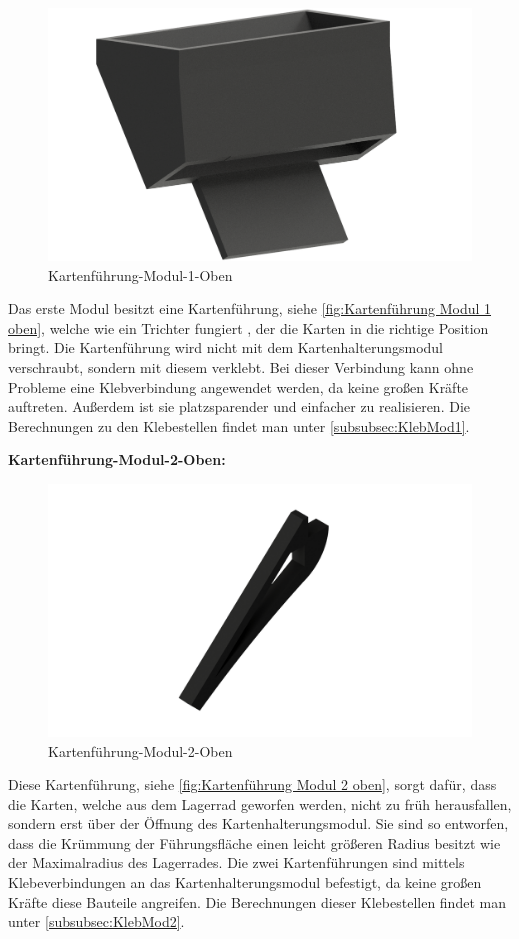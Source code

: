 \begin{figure}
    \includegraphics[width=8 cm]{fig/mech/KarteneinlaufNeu}
    \caption{Kartenführung-Modul-1-Oben}
    \label{fig:Kartenführung Modul 1 oben}
\end{figure}
Das erste Modul besitzt eine Kartenführung, siehe \autoref{fig:Kartenführung Modul 1 oben}, welche wie ein Trichter fungiert , der die Karten in die richtige Position bringt.
Die Kartenführung wird nicht mit dem Kartenhalterungsmodul verschraubt, sondern mit diesem verklebt.
Bei dieser Verbindung kann ohne Probleme eine Klebverbindung angewendet werden, da keine großen Kräfte auftreten.
Außerdem ist sie platzsparender und einfacher zu realisieren.
Die Berechnungen zu den Klebestellen findet man unter \autoref{subsubsec:KlebMod1}.

\pagebreak
\textbf{Kartenführung-Modul-2-Oben:}

\begin{figure}
    \includegraphics[width=7 cm]{fig/mech/StopperOben}
    \caption{Kartenführung-Modul-2-Oben}
    \label{fig:Kartenführung Modul 2 oben}
\end{figure}
Diese Kartenführung, siehe \autoref{fig:Kartenführung Modul 2 oben}, sorgt dafür, dass die Karten, welche aus dem Lagerrad geworfen werden, nicht zu früh herausfallen,
sondern erst über der Öffnung des Kartenhalterungsmodul.
Sie sind so entworfen, dass die Krümmung der Führungsfläche einen leicht größeren Radius besitzt wie der Maximalradius des Lagerrades.
Die zwei Kartenführungen sind mittels Klebeverbindungen an das Kartenhalterungsmodul befestigt, da keine großen Kräfte diese Bauteile angreifen.
Die Berechnungen dieser Klebestellen findet man unter \autoref{subsubsec:KlebMod2}. \\

